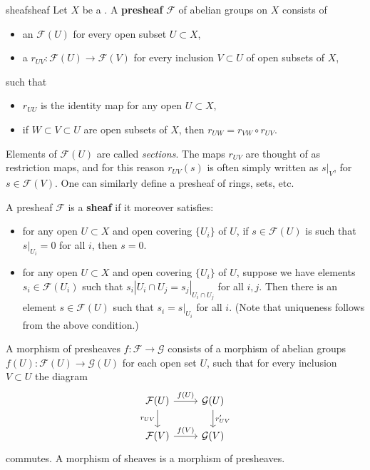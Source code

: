 \begin{topic}{sheaf}{sheaf}
    Let $X$ be a . A \textbf{presheaf} $\mathcal{F}$ of abelian groups on $X$ consists of
    \begin{itemize}
        \item an  $\mathcal{F}(U)$ for every open subset $U \subset X$,
        \item a  $r_{UV} : \mathcal{F}(U) \to \mathcal{F}(V)$ for every inclusion $V \subset U$ of open subsets of $X$,
    \end{itemize}
    such that
    \begin{itemize}
        \item $r_{UU}$ is the identity map for any open $U \subset X$,
        \item if $W \subset V \subset U$ are open subsets of $X$, then $r_{UW} = r_{VW} \circ r_{UV}$.
    \end{itemize}
    Elements of $\mathcal{F}(U)$ are called \textit{sections}. The maps $r_{UV}$ are thought of as restriction maps, and for this reason $r_{UV}(s)$ is often simply written as $s|_V$, for $s \in \mathcal{F}(V)$. One can similarly define a presheaf of rings, sets, etc.
    
    A presheaf $\mathcal{F}$ is a \textbf{sheaf} if it moreover satisfies:
    \begin{itemize}
        \item for any open $U \subset X$ and open covering $\{ U_i \}$ of $U$, if $s \in \mathcal{F}(U)$ is such that $s|_{U_i} = 0$ for all $i$, then $s = 0$.
        \item for any open $U \subset X$ and open covering $\{ U_i \}$ of $U$, suppose we have elements $s_i \in \mathcal{F}(U_i)$ such that $s_i|{U_i \cap U_j} = s_j|_{U_i \cap U_j}$ for all $i, j$. Then there is an element $s \in \mathcal{F}(U)$ such that $s_i = s|_{U_i}$ for all $i$. (Note that uniqueness follows from the above condition.)
    \end{itemize}
    
    A morphism of presheaves $f : \mathcal{F} \to \mathcal{G}$ consists of a morphism of abelian groups $f(U) : \mathcal{F}(U) \to \mathcal{G}(U)$ for each open set $U$, such that for every inclusion $V \subset U$ the diagram
    \[ \begin{tikzcd} \mathcal{F}(U) \arrow{r}{f(U)} \arrow[swap]{d}{r_{UV}} & \mathcal{G}(U) \arrow{d}{r'_{UV}} \\ \mathcal{F}(V) \arrow{r}{f(V)} & \mathcal{G}(V) \end{tikzcd} \]
    commutes. A morphism of sheaves is a morphism of presheaves.
\end{topic}

